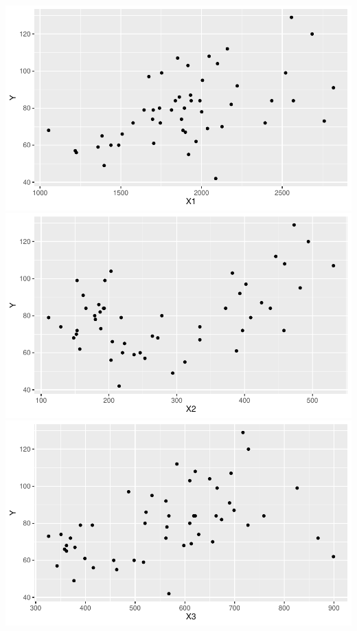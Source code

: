 \documentclass[12pt,letterpaper]{article}
\begin{document}
\begin{enumerate}
	\includegraphics{Qplot11}
	\includegraphics{Qplot21}
	\includegraphics{Qplot3}
	

\end{enumerate}
\end{document}
